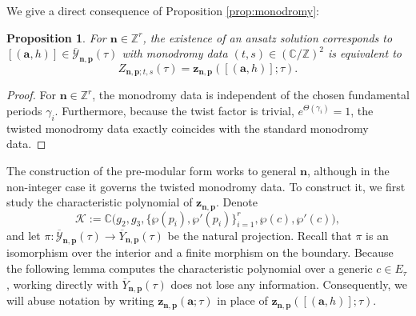 \documentclass[11pt]{amsart}
\newtheorem{proposition}[theorem]{Proposition}
\theoremstyle{remark}
\numberwithin{equation}{section}
\begin{document}
We give a direct consequence of Proposition \ref{prop:monodromy}:
\begin{proposition} \label{p:GH}
For $\mathbf{n} \in \mathbb{Z}^r$, the existence of an ansatz solution corresponds to $[(\mathbf{a},h)] \in \overline{\mathcal{Y}}_{\mathbf{n},\mathbf{p}}(\tau)$ with monodromy data $(t,s) \in (\mathbb{C}/\mathbb{Z})^2$ is equivalent to
\begin{equation} \label{e:Green_Hecke}
    Z_{\mathbf{n},\mathbf{p};t,s} (\tau) = \mathbf{z}_{\mathbf{n},\mathbf{p}}([(\mathbf{a},h)];\tau).
\end{equation}
\end{proposition}
\begin{proof}
For $\mathbf{n} \in \mathbb{Z}^r$, the monodromy data is independent of the chosen fundamental periods $\gamma_i$. Furthermore, because the twist factor is trivial, $e^{\Theta(\gamma_i)} = 1$, the twisted monodromy data exactly coincides with the standard monodromy data.
\end{proof}

The construction of the pre-modular form works to general $\mathbf{n}$, although in the non-integer case it governs the twisted monodromy data. To construct it, we first study the characteristic polynomial of $\mathbf{z}_{\mathbf{n},\mathbf{p}}$. Denote 
\[
    \mathcal{K} := \mathbb{C}\Big(g_2, g_3, \{\wp(p_i), \wp'(p_i)\}_{i=1}^r, \wp(c), \wp'(c)\Big),
\]
and let $\pi: \overline{\mathcal{Y}}_{\mathbf{n},\mathbf{p}}(\tau) \rightarrow \overline{Y}_{\mathbf{n},\mathbf{p}}(\tau)$ be the natural projection. Recall that $\pi$ is an isomorphism over the interior and a finite morphism on the boundary. Because the following lemma computes the characteristic polynomial over a generic $c \in E_\tau$, working directly with $\overline{Y}_{\mathbf{n},\mathbf{p}}(\tau)$ does not lose any information. Consequently, we will abuse notation by writing $\mathbf{z}_{\mathbf{n},\mathbf{p}}(\mathbf{a};\tau)$ in place of $\mathbf{z}_{\mathbf{n},\mathbf{p}}([(\mathbf{a},h)];\tau)$.
\end{document}
